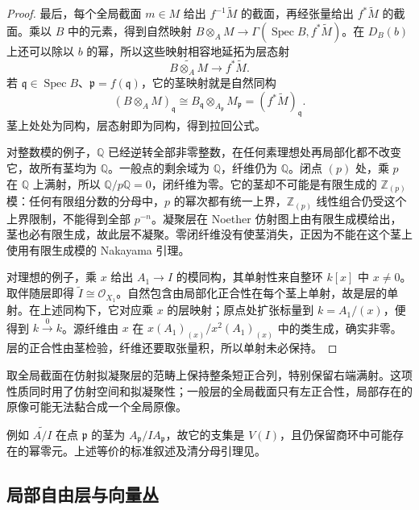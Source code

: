 \begin{proof}
	最后，每个全局截面 \(m\in M\) 给出 \(f^{-1}\widetilde M\) 的截面，再经张量给出 \(f^*\widetilde M\) 的截面。乘以 \(B\) 中的元素，得到自然映射 \(B\otimes_AM\to\Gamma(\operatorname{Spec}B,f^*\widetilde M)\)。在 \(D_B(b)\) 上还可以除以 \(b\) 的幂，所以这些映射相容地延拓为层态射
	\[
		\widetilde{B\otimes_AM}\longrightarrow f^*\widetilde M.
	\]
	若 \(\mathfrak q\in\operatorname{Spec}B\)、\(\mathfrak p=f(\mathfrak q)\)，它的茎映射就是自然同构
	\[
		(B\otimes_AM)_{\mathfrak q} \cong B_{\mathfrak q}\otimes_{A_{\mathfrak p}}M_{\mathfrak p} =(f^*\widetilde M)_{\mathfrak q}.
	\]
	茎上处处为同构，层态射即为同构，得到拉回公式。

	对整数模的例子，\(\mathbb Q\) 已经逆转全部非零整数，在任何素理想处再局部化都不改变它，故所有茎均为 \(\mathbb Q\)。一般点的剩余域为 \(\mathbb Q\)，纤维仍为 \(\mathbb Q\)。闭点 \((p)\) 处，乘 \(p\) 在 \(\mathbb Q\) 上满射，所以 \(\mathbb Q/p\mathbb Q=0\)，闭纤维为零。它的茎却不可能是有限生成的 \(\mathbb Z_{(p)}\) 模：任何有限组分数的分母中，\(p\) 的幂次都有统一上界，\(\mathbb Z_{(p)}\) 线性组合仍受这个上界限制，不能得到全部 \(p^{-n}\)。凝聚层在 Noether 仿射图上由有限生成模给出，茎也必有限生成，故此层不凝聚。零闭纤维没有使茎消失，正因为不能在这个茎上使用有限生成模的 Nakayama 引理。

	对理想的例子，乘 \(x\) 给出 \(A_1\to I\) 的模同构，其单射性来自整环 \(k[x]\) 中 \(x\ne0\)。取伴随层即得 \(\widetilde I\cong\mathcal O_{X_1}\)。自然包含由局部化正合性在每个茎上单射，故是层的单射。在上述同构下，它对应乘 \(x\) 的层映射；原点处扩张标量到 \(k=A_1/(x)\)，便得到 \(k\xrightarrow{0}k\)。源纤维由 \(x\) 在 \(x(A_1)_{(x)}/x^2(A_1)_{(x)}\) 中的类生成，确实非零。层的正合性由茎检验，纤维还要取张量积，所以单射未必保持。
\end{proof}

取全局截面在仿射拟凝聚层的范畴上保持整条短正合列，特别保留右端满射。这项性质同时用了仿射空间和拟凝聚性；一般层的全局截面只有左正合性，局部存在的原像可能无法黏合成一个全局原像。

\ProseParagraphBreak
例如 \(\widetilde{A/I}\) 在点 \(\mathfrak p\) 的茎为 \(A_{\mathfrak p}/IA_{\mathfrak p}\)，故它的支集是 \(V(I)\)，且仍保留商环中可能存在的幂零元。上述等价的标准叙述及清分母引理见\cite[Chapter II, Lemma 5.3, Proposition 5.4 and Corollary 5.5, pp. 112--113]{Hartshorne1977}。

\subsection{局部自由层与向量丛}
\label{b3:subsec:2402:02}


